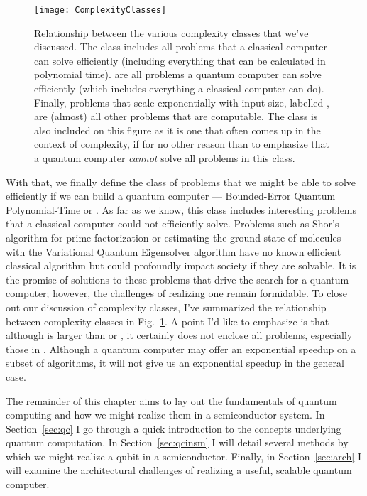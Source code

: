 \begin{figure}
  \texttt{[image: ComplexityClasses]}
  \caption[Relationship between various complexity classes]
  {Relationship between the various complexity classes that we've discussed. The class
   includes all problems that a classical computer can solve efficiently (including
  everything that can be calculated in polynomial time).  are all problems a quantum computer can
  solve efficiently (which includes everything a classical computer can do). Finally, problems that scale exponentially
  with input size, labelled , are (almost) all other problems that are computable. The class
   is also included on this figure as it is one that often comes up in the context of complexity,
  if for no other reason than to emphasize that a quantum computer \emph{cannot} solve all problems in
  this class.}
  \label{fig:complexity}
\end{figure}

With that, we finally define the class of problems that we might be able to solve efficiently if we
can build a quantum computer --- Bounded-Error Quantum Polynomial-Time or . As far as we know,
this class includes interesting problems that a classical computer could not efficiently solve. Problems
such as Shor's algorithm for prime factorization \cite{Shor} or estimating the ground state of molecules with
the Variational Quantum Eigensolver algorithm \cite{ncomms5213} have no known efficient classical algorithm
but could profoundly impact society if they are solvable. It is the promise of solutions to these problems
that drive the search for a quantum computer; however, the challenges of realizing one remain formidable. To close
out our discussion of complexity classes, I've summarized the relationship between complexity classes in
Fig.~\ref{fig:complexity}. A point I'd like to emphasize is that although  is larger than 
or , it certainly does not enclose all problems, especially those in . Although a
quantum computer may offer an exponential speedup on a subset of algorithms, it will not give us an exponential
speedup in the general case.

The remainder of this chapter aims to lay out the fundamentals of quantum computing and how we might realize
them in a semiconductor system. In Section~\ref{sec:qc} I go through a quick introduction to the concepts
underlying quantum computation. In Section~\ref{sec:qcinsm} I will detail several methods by which we might
realize a qubit in a semiconductor. Finally, in Section~\ref{sec:arch} I will examine the architectural
challenges of realizing a useful, scalable quantum computer.

